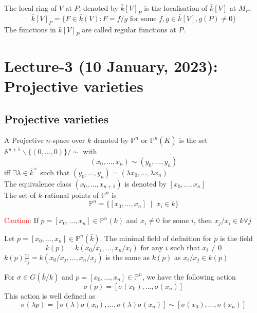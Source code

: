 \documentclass[oneside, 12pt]{scrbook}
\theoremstyle{theorem}
\begin{document}
\begin{proposition}
The local ring of $V$ at $P$, denoted by $\bar{k}[V]_{P}$ is the localisation of $\bar{k}[V]$ at $M_{P}$. 
\begin{equation}
\bar{k}[V]_{P} = \{F \in \bar{k}(V): F = f/g \text{ for some } f,g \in \bar{k}[V], g(P)\neq 0\}
\end{equation}
The functions in $\bar{k}[V]_{P}$ are called regular functions at $P$.
\end{proposition}

\chapter{Lecture-3 (10 January, 2023): Projective varieties}

\section{Projective varieties}

\begin{definition}
A Projective $n$-space over $k$ denoted by $\mathbb{P}^n$ or $\mathbb{P}^{n}(\bar{K})$ is the set $\mathbb{A}^{n+1} \backslash \{(0,\hdots , 0)\} / \sim$ with  
$$(x_{0}, \hdots ,x_{n}) \sim (y_{0},\hdots ,y_{n})$$ iff $\exists \lambda \in \bar{k}^{\times}$ such that $(y_{0},\hdots ,y_{n}) = (\lambda x_{0},\hdots ,\lambda x_{n})$\\
The equivalence class $(x_{0},\hdots ,x_{n+1})$ is denoted by $[x_{0},\hdots ,x_{n}]$\\
The set of $k$-rational points of $\mathbb{P}^n$ is $$\mathbb{P}^n = \{[x_{0}, \hdots , x_{n}]\; \mid \; x_{i} \in k\}$$
\end{definition}

\textcolor{red}{Caution}: If $p = [x_{0},\hdots ,x_{n}] \in \mathbb{P}^n(k)$ and $x_{i} \neq 0$ for some $i$, then $x_{j}/x_{i} \in k \forall j$

\begin{definition}
Let $p = [x_{0},\hdots ,x_{n}] \in \mathbb{P}^n(\bar{k})$. The minimal field of definition for $p$ is the field $$k(p) = k(x_{0}/x_{i},\hdots ,x_{n}/x_{i}) \text{ for any } i \text{ such that } x_{i} \neq 0$$
$k(p) \frac{x_{i}}{x_{j}} = k(x_{0}/x_{j},\hdots ,x_{n}/x_{j})$ is the same as $k(p)$ as $x_{i}/x_{j} \in k(p)$
\end{definition}  

For $\sigma \in G(\bar{k}/k)$ and $p = [x_{0},\hdots ,x_{n}] \in \mathbb{P}^n$, we have the following action $$\sigma(p) = [\sigma(x_{0}),\hdots ,\sigma(x_{n})]$$
This action is well defined as $$\sigma(\lambda p) = [\sigma(\lambda)\sigma(x_{0}),\hdots ,\sigma(\lambda) \sigma(x_{n})] \sim [\sigma(x_{0}),\hdots ,\sigma(x_{n})]$$
\end{document}
